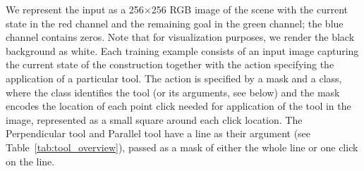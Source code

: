 We represent the \maskrcnn input as a 256$\times$256 RGB image of the scene with the current state in the red channel and the remaining goal in the green channel; the blue channel contains zeros.
Note that for visualization purposes, we render the black background as white.
Each training example consists of an input image capturing the current state of the construction together with the action specifying the application of a particular tool.
The action is specified by a mask and a class, where the class identifies the tool (or its arguments, see below) and the mask encodes the location of each point click needed for application of the tool in the image, represented as a small square around each click location.
The Perpendicular tool and Parallel tool
have a line as their argument (see Table~\ref{tab:tool_overview}), passed as a mask of either the whole line or one click on the line.

